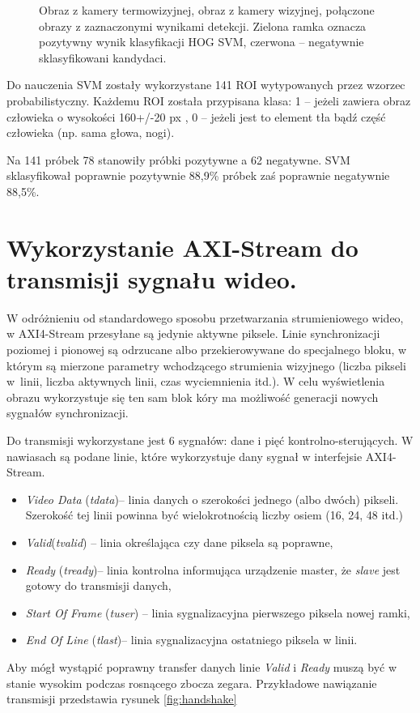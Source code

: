 \begin{figure}[h]
\caption[Detekcja]{\protect{} Obraz z kamery termowizyjnej, \protect{} obraz z kamery wizyjnej, \protect{} połączone obrazy z zaznaczonymi wynikami detekcji. Zielona ramka oznacza pozytywny wynik klasyfikacji HOG SVM, czerwona -- negatywnie sklasyfikowani kandydaci.}
\end{figure}

Do nauczenia SVM zostały wykorzystane 141 ROI wytypowanych przez wzorzec probabilistyczny. Każdemu ROI została przypisana klasa: 1 -- jeżeli zawiera obraz człowieka o wysokości 160+/-20 px , 0 -- jeżeli jest to element tła bądź część człowieka (np. sama głowa, nogi).

Na 141 próbek 78 stanowiły próbki pozytywne a 62 negatywne. SVM sklasyfikował poprawnie pozytywnie 88,9\% próbek zaś poprawnie negatywnie 88,5\%.


\section{Wykorzystanie AXI-Stream do transmisji sygnału wideo.}
W odróżnieniu od standardowego sposobu przetwarzania strumieniowego wideo, w AXI4-Stream przesyłane są jedynie aktywne piksele.
Linie synchronizacji poziomej i pionowej są odrzucane albo przekierowywane do specjalnego bloku, w którym są mierzone parametry wchodzącego strumienia wizyjnego (liczba pikseli w~linii, liczba aktywnych linii, czas wyciemnienia itd.).
W celu wyświetlenia obrazu wykorzystuje się ten sam blok kóry ma możliwość generacji nowych sygnałów synchronizacji.

Do transmisji wykorzystane jest 6 sygnałów: dane i pięć kontrolno-sterujących. W nawiasach są podane linie, które wykorzystuje dany sygnał w interfejsie AXI4-Stream.
\begin{itemize}
\item \textit{Video Data} (\textit{tdata})-- linia danych o szerokości jednego (albo dwóch) pikseli. Szerokość tej linii powinna być wielokrotnością liczby osiem (16, 24, 48 itd.)
\item \textit{Valid}(\textit{tvalid}) -- linia określająca czy dane piksela są poprawne,
\item \textit{Ready} (\textit{tready})-- linia kontrolna informująca urządzenie master, że \textit{slave} jest gotowy do transmisji danych, %
\item \textit{Start Of Frame} (\textit{tuser}) -- linia sygnalizacyjna pierwszego piksela nowej ramki,
\item \textit{End Of Line} (\textit{tlast})-- linia sygnalizacyjna ostatniego piksela w linii. %

\end{itemize}
Aby mógł wystąpić poprawny transfer danych linie \textit{Valid} i \textit{Ready} muszą być w stanie wysokim podczas rosnącego zbocza zegara.
Przykładowe nawiązanie transmisji przedstawia rysunek \ref{fig:handshake}

